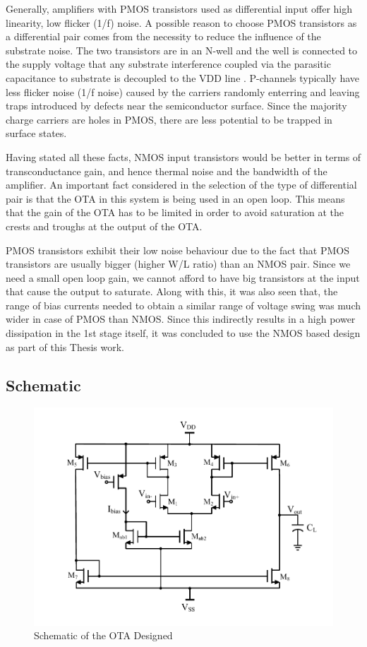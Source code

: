 Generally, amplifiers with PMOS transistors used as differential input offer high linearity, low flicker (1/f) noise. A possible reason to choose PMOS transistors as a differential pair comes from the necessity to reduce the influence of the substrate noise. The two transistors are in an N-well and the well is connected to the supply voltage that any substrate interference coupled via the parasitic capacitance to substrate is decoupled to the VDD line \cite{ota_hf}. P-channels typically have less flicker noise (1/f noise) caused by the carriers randomly enterring and leaving traps introduced by defects near the semiconductor surface. Since the majority charge carriers are holes in PMOS, there are less potential to be trapped in surface states.

Having stated all these facts, NMOS input transistors would be better in terms of transconductance gain, and hence thermal noise and the bandwidth of the amplifier. An important fact considered in the selection of the type of differential pair is that the OTA in this system is being used in an open loop. This means that the gain of the OTA has to be limited in order to avoid saturation at the crests and troughs at the output of the OTA.

PMOS transistors exhibit their low noise behaviour due to the fact that PMOS transistors are usually bigger (higher W/L ratio) than an NMOS pair. Since we need a small open loop gain, we cannot afford to have big transistors at the input that cause the output to saturate. Along with this, it was also seen that, the range of bias currents needed to obtain a similar range of voltage swing was much wider in case of PMOS than NMOS. Since this indirectly results in a high power dissipation in the 1st stage itself, it was concluded to use the NMOS based design as part of this Thesis work.
\vfill
\clearpage
\subsection{Schematic}

\begin{figure} [H]
\centering
\includegraphics[scale=1]{Figures/Schematics/OTA_NMOS_Vbias.pdf}
\caption{Schematic of the OTA Designed}
\label{fig:OTA_Schematic}
\end{figure}

